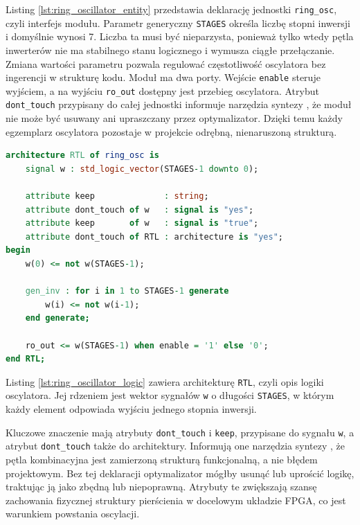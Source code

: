 Listing \ref{lst:ring_oscillator_entity} przedstawia deklarację jednostki
\texttt{ring\_osc}, czyli interfejs modułu. Parametr generyczny
\texttt{STAGES} określa liczbę stopni inwersji i domyślnie wynosi 7. Liczba
ta musi być nieparzysta, ponieważ tylko wtedy pętla inwerterów nie ma
stabilnego stanu logicznego i wymusza ciągłe przełączanie. Zmiana wartości
parametru pozwala regulować częstotliwość oscylatora bez ingerencji
w strukturę kodu. Moduł ma dwa porty. Wejście \texttt{enable} steruje wyjściem, a na wyjściu
\texttt{ro\_out} dostępny jest przebieg oscylatora.
Atrybut \texttt{dont\_touch} przypisany do całej jednostki informuje narzędzia
syntezy \cite{amd_vivado_donttouch}, że moduł nie może być usuwany ani
upraszczany przez optymalizator. Dzięki temu każdy egzemplarz oscylatora
pozostaje w projekcie odrębną, nienaruszoną strukturą.

\begin{lstlisting}[language=VHDL,
caption={Logika oscylatora pierścieniowego (ring\_oscillator.vhdl)},
label={lst:ring_oscillator_logic}]
architecture RTL of ring_osc is
    signal w : std_logic_vector(STAGES-1 downto 0);

    attribute keep              : string;
    attribute dont_touch of w   : signal is "yes";
    attribute keep       of w   : signal is "true";
    attribute dont_touch of RTL : architecture is "yes";
begin
    w(0) <= not w(STAGES-1);

    gen_inv : for i in 1 to STAGES-1 generate
        w(i) <= not w(i-1);
    end generate;

    ro_out <= w(STAGES-1) when enable = '1' else '0';
end RTL;
\end{lstlisting}

Listing \ref{lst:ring_oscillator_logic} zawiera architekturę \texttt{RTL},
czyli opis logiki oscylatora. Jej rdzeniem jest wektor sygnałów \texttt{w}
o długości \texttt{STAGES}, w którym każdy element odpowiada wyjściu jednego
stopnia inwersji.

Kluczowe znaczenie mają atrybuty \texttt{dont\_touch} i \texttt{keep},
przypisane do sygnału \texttt{w}, a atrybut \texttt{dont\_touch} także do
architektury. Informują one narzędzia syntezy
\cite{amd_vivado_donttouch,amd_vivado_keep}, że pętla kombinacyjna jest
zamierzoną strukturą funkcjonalną, a nie błędem projektowym. Bez tej
deklaracji optymalizator mógłby usunąć lub uprościć logikę, traktując ją jako
zbędną lub niepoprawną. Atrybuty te zwiększają szansę zachowania fizycznej
struktury pierścienia w docelowym układzie FPGA, co jest warunkiem powstania
oscylacji.

